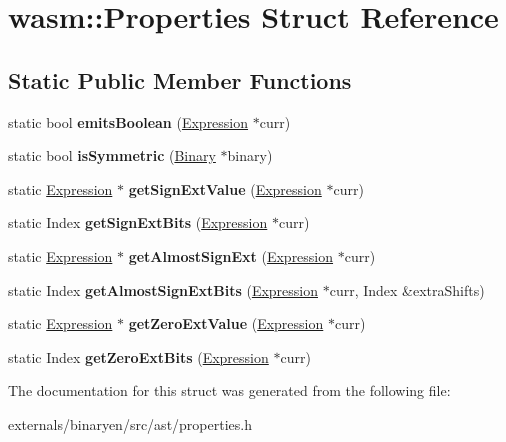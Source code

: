 \hypertarget{structwasm_1_1_properties}{}\section{wasm\+:\+:Properties Struct Reference}
\label{structwasm_1_1_properties}
\subsection*{Static Public Member Functions}
\begin{DoxyCompactItemize}
\item 
\mbox{\label{structwasm_1_1_properties_a92d4cd0c5d52bee917b2120f4db53f36}} 
static bool {\bfseries emits\+Boolean} (\mbox{\hyperlink{classwasm_1_1_expression}{Expression}} $\ast$curr)
\item 
\mbox{\label{structwasm_1_1_properties_ad8904005fdca0a1468ffef8ea3a10b83}} 
static bool {\bfseries is\+Symmetric} (\mbox{\hyperlink{classwasm_1_1_binary}{Binary}} $\ast$binary)
\item 
\mbox{\label{structwasm_1_1_properties_afe72804c3d2ca2b41014c4e5c28d08f4}} 
static \mbox{\hyperlink{classwasm_1_1_expression}{Expression}} $\ast$ {\bfseries get\+Sign\+Ext\+Value} (\mbox{\hyperlink{classwasm_1_1_expression}{Expression}} $\ast$curr)
\item 
\mbox{\label{structwasm_1_1_properties_afff16c6bbb98fdef1cca6328c8036777}} 
static Index {\bfseries get\+Sign\+Ext\+Bits} (\mbox{\hyperlink{classwasm_1_1_expression}{Expression}} $\ast$curr)
\item 
\mbox{\label{structwasm_1_1_properties_a5f25863f6506d7e46ae524a291df1b3c}} 
static \mbox{\hyperlink{classwasm_1_1_expression}{Expression}} $\ast$ {\bfseries get\+Almost\+Sign\+Ext} (\mbox{\hyperlink{classwasm_1_1_expression}{Expression}} $\ast$curr)
\item 
\mbox{\label{structwasm_1_1_properties_a41fa27f1ced62c16df5aaddf348d7dba}} 
static Index {\bfseries get\+Almost\+Sign\+Ext\+Bits} (\mbox{\hyperlink{classwasm_1_1_expression}{Expression}} $\ast$curr, Index \&extra\+Shifts)
\item 
\mbox{\label{structwasm_1_1_properties_a565e260d5b42178b35a103657e3d6d23}} 
static \mbox{\hyperlink{classwasm_1_1_expression}{Expression}} $\ast$ {\bfseries get\+Zero\+Ext\+Value} (\mbox{\hyperlink{classwasm_1_1_expression}{Expression}} $\ast$curr)
\item 
\mbox{\label{structwasm_1_1_properties_a57a3ece02be674c1d4ec35792abb65cf}} 
static Index {\bfseries get\+Zero\+Ext\+Bits} (\mbox{\hyperlink{classwasm_1_1_expression}{Expression}} $\ast$curr)
\end{DoxyCompactItemize}


The documentation for this struct was generated from the following file\+:\begin{DoxyCompactItemize}
\item 
externals/binaryen/src/ast/properties.\+h\end{DoxyCompactItemize}
